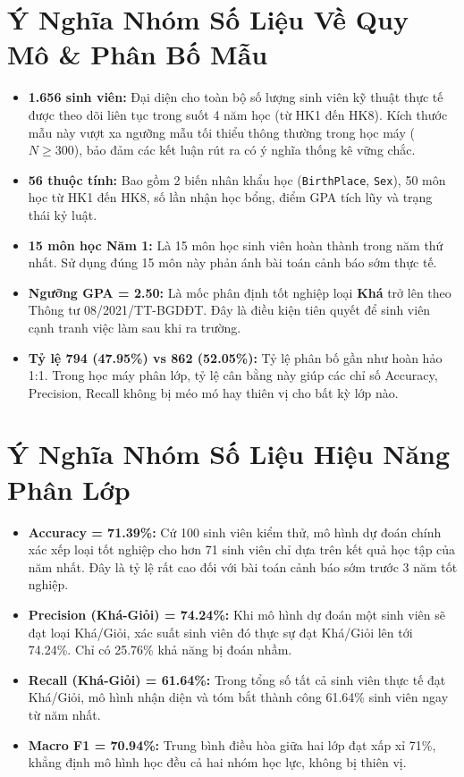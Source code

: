 \documentclass[12pt,a4paper]{article}
\begin{document}
\section{Ý Nghĩa Nhóm Số Liệu Về Quy Mô & Phân Bố Mẫu}
\begin{itemize}
    \item \textbf{1.656 sinh viên:} Đại diện cho toàn bộ số lượng sinh viên kỹ thuật thực tế được theo dõi liên tục trong suốt 4 năm học (từ HK1 đến HK8). Kích thước mẫu này vượt xa ngưỡng mẫu tối thiểu thông thường trong học máy ($N \ge 300$), bảo đảm các kết luận rút ra có ý nghĩa thống kê vững chắc.
    \item \textbf{56 thuộc tính:} Bao gồm 2 biến nhân khẩu học (\texttt{BirthPlace}, \texttt{Sex}), 50 môn học từ HK1 đến HK8, số lần nhận học bổng, điểm GPA tích lũy và trạng thái kỷ luật.
    \item \textbf{15 môn học Năm 1:} Là 15 môn học sinh viên hoàn thành trong năm thứ nhất. Sử dụng đúng 15 môn này phản ánh bài toán cảnh báo sớm thực tế.
    \item \textbf{Ngưỡng GPA = 2.50:} Là mốc phân định tốt nghiệp loại \textbf{Khá} trở lên theo Thông tư 08/2021/TT-BGDĐT. Đây là điều kiện tiên quyết để sinh viên cạnh tranh việc làm sau khi ra trường.
    \item \textbf{Tỷ lệ 794 (47.95\%) vs 862 (52.05\%):} Tỷ lệ phân bố gần như hoàn hảo 1:1. Trong học máy phân lớp, tỷ lệ cân bằng này giúp các chỉ số Accuracy, Precision, Recall không bị méo mó hay thiên vị cho bất kỳ lớp nào.
\end{itemize}

\section{Ý Nghĩa Nhóm Số Liệu Hiệu Năng Phân Lớp}
\begin{itemize}
    \item \textbf{Accuracy = 71.39\%:} Cứ 100 sinh viên kiểm thử, mô hình dự đoán chính xác xếp loại tốt nghiệp cho hơn 71 sinh viên chỉ dựa trên kết quả học tập của năm nhất. Đây là tỷ lệ rất cao đối với bài toán cảnh báo sớm trước 3 năm tốt nghiệp.
    \item \textbf{Precision (Khá-Giỏi) = 74.24\%:} Khi mô hình dự đoán một sinh viên sẽ đạt loại Khá/Giỏi, xác suất sinh viên đó thực sự đạt Khá/Giỏi lên tới 74.24\%. Chỉ có 25.76\% khả năng bị đoán nhầm.
    \item \textbf{Recall (Khá-Giỏi) = 61.64\%:} Trong tổng số tất cả sinh viên thực tế đạt Khá/Giỏi, mô hình nhận diện và tóm bắt thành công 61.64\% sinh viên ngay từ năm nhất.
    \item \textbf{Macro F1 = 70.94\%:} Trung bình điều hòa giữa hai lớp đạt xấp xỉ 71\%, khẳng định mô hình học đều cả hai nhóm học lực, không bị thiên vị.
\end{itemize}
\end{document}
